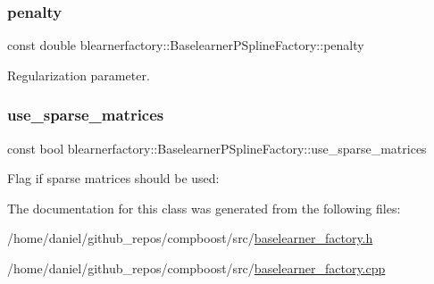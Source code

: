 \subsubsection{\texorpdfstring{penalty}{penalty}}
{\footnotesize\ttfamily const double blearnerfactory\+::\+Baselearner\+P\+Spline\+Factory\+::penalty\hspace{0.3cm}{\ttfamily [private]}}



Regularization parameter. 

\mbox{\label{classblearnerfactory_1_1_baselearner_p_spline_factory_ac0e83c55bc1d631663f639fea394e253}} 
\subsubsection{\texorpdfstring{use\+\_\+sparse\+\_\+matrices}{use\_sparse\_matrices}}
{\footnotesize\ttfamily const bool blearnerfactory\+::\+Baselearner\+P\+Spline\+Factory\+::use\+\_\+sparse\+\_\+matrices\hspace{0.3cm}{\ttfamily [private]}}



Flag if sparse matrices should be used\+: 



The documentation for this class was generated from the following files\+:\begin{DoxyCompactItemize}
\item 
/home/daniel/github\+\_\+repos/compboost/src/\hyperlink{baselearner__factory_8h}{baselearner\+\_\+factory.\+h}\item 
/home/daniel/github\+\_\+repos/compboost/src/\hyperlink{baselearner__factory_8cpp}{baselearner\+\_\+factory.\+cpp}\end{DoxyCompactItemize}
